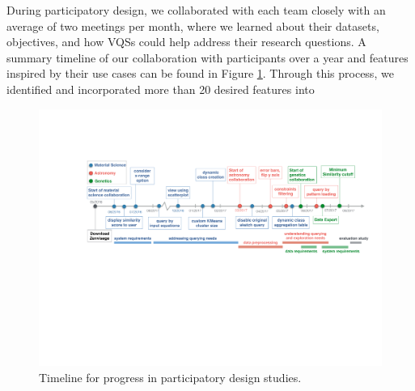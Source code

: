 \par During participatory design, we collaborated with each team closely with an average of two meetings per month, where we learned about their datasets, objectives, and how VQSs could help address their research questions. A summary timeline of our collaboration with participants over a year and features inspired by their use cases can be found in Figure \ref{timeline}. 
Through this process, we identified and incorporated more than 20 desired features into 
\begin{figure}[ht!]
	\centering
	\captionsetup{justification=centering,margin=2cm}
	\vspace{-10pt}
	\includegraphics[width=6in]{figures/timeline_anon.pdf}
	\vspace{-6pt}\caption{Timeline for progress in participatory design studies.}
	\label{timeline}
	\vspace{-10pt}
\end{figure}
\vspace{-10pt}
